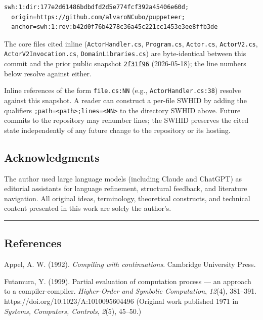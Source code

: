 \documentclass[
]{article}
\let\origtexttt\texttt%
\renewcommand{\texttt}[1]{\origtexttt{\seqsplit{#1}}}%
\let\texttt\origtexttt%
\begin{document}
\begin{verbatim}
swh:1:dir:177e2d61486bdbdfd2d5e774fcf392a45406e60d;
  origin=https://github.com/alvaroNCubo/puppeteer;
  anchor=swh:1:rev:b42d0f76b4278c36a45c221cc1453e3ee8ffb3de
\end{verbatim}

The core files cited inline (\texttt{ActorHandler.cs},
\texttt{Program.cs}, \texttt{Actor.cs}, \texttt{ActorV2.cs},
\texttt{ActorV2Invocation.cs}, \texttt{DomainLibraries.cs}) are
byte-identical between this commit and the prior public snapshot
\href{https://github.com/alvaroNCubo/puppeteer/tree/2f31f9674a5de816bdf1bf9d8360ff218a02e4da}{\texttt{2f31f96}}
(2026-05-18); the line numbers below resolve against either.

Inline references of the form \texttt{file.cs:NN} (e.g.,
\texttt{ActorHandler.cs:38}) resolve against this snapshot. A reader can
construct a per-file SWHID by adding the qualifiers
\texttt{;path=\textless{}path\textgreater{};lines=\textless{}NN\textgreater{}}
to the directory SWHID above. Future commits to the repository may
renumber lines; the SWHID preserves the cited state independently of any
future change to the repository or its hosting.

\subsection{Acknowledgments}\label{acknowledgments}

The author used large language models (including Claude and ChatGPT) as
editorial assistants for language refinement, structural feedback, and
literature navigation. All original ideas, terminology, theoretical
constructs, and technical content presented in this work are solely the
author's.

\begin{center}\rule{0.5\linewidth}{0.5pt}\end{center}

\subsection{References}\label{references}

Appel, A. W. (1992). \emph{Compiling with continuations}. Cambridge
University Press.

Futamura, Y. (1999). Partial evaluation of computation process --- an
approach to a compiler-compiler. \emph{Higher-Order and Symbolic
Computation}, \emph{12}(4), 381--391.
https://doi.org/10.1023/A:1010095604496 (Original work published 1971 in
\emph{Systems, Computers, Controls}, \emph{2}(5), 45--50.)
\end{document}
